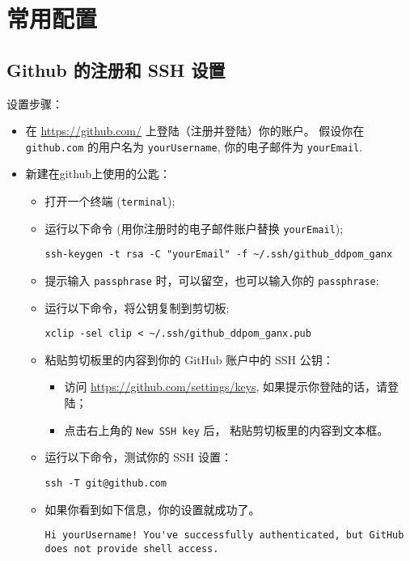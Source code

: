 \documentclass[
    11pt,
    cite=authoryear,
    device=normal,
    lang=cn,
    mode=simple,
    result=answer,
    toc=onecol,
]{elegantbook_sierxue}
\begin{document}
\newpage
\section{常用配置}%
\label{sec:git-settings}

\subsection{Github 的注册和 SSH 设置}%
\label{sub:git-ssh}

设置步骤：
\begin{itemize}
    \item 在 \href{https://github.com/}{https://github.com/}
        上登陆（注册并登陆）你的账户。
        假设你在 \lstinline{github.com} 的用户名为 \lstinline{yourUsername},
        你的电子邮件为 \lstinline{yourEmail}.
    \item 新建在github上使用的公匙：
        \begin{itemize}
            \item 打开一个终端 (\lstinline{terminal});
            \item 运行以下命令 (用你注册时的电子邮件账户替换
                \lstinline{yourEmail});
\begin{lstlisting}
ssh-keygen -t rsa -C "yourEmail" -f ~/.ssh/github_ddpom_ganx
\end{lstlisting}
            \item 提示输入 \lstinline{passphrase}
                时，可以留空，也可以输入你的 \lstinline{passphrase};
            \item 运行以下命令，将公钥复制到剪切板;
\begin{lstlisting}
xclip -sel clip < ~/.ssh/github_ddpom_ganx.pub
\end{lstlisting}
            \item 粘贴剪切板里的内容到你的 GitHub 账户中的 SSH 公钥：
                \begin{itemize}
                    \item 访问 \href{https://github.com/settings/keys}
                        {https://github.com/settings/keys},
                        如果提示你登陆的话，请登陆；
                    \item 点击右上角的 \lstinline{New SSH key} 后，
                        粘贴剪切板里的内容到文本框。
                \end{itemize}
            \item 运行以下命令，测试你的 SSH 设置：
\begin{lstlisting}
ssh -T git@github.com
\end{lstlisting}
            \item 如果你看到如下信息，你的设置就成功了。
\begin{lstlisting}
Hi yourUsername! You've successfully authenticated, but GitHub does not provide shell access.
\end{lstlisting}
        \end{itemize}
\end{itemize}
\end{document}
